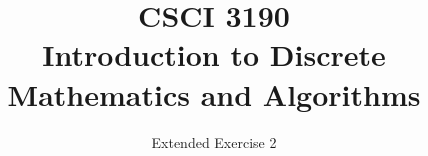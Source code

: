 \documentclass{sig-alternate-05-2015}
\begin{document}






%

\title{CSCI 3190 \\ Introduction to Discrete Mathematics and Algorithms}
\subtitle{Extended Exercise 2}

\maketitle
\begin{abstract}

\end{abstract}

\keywords{}
\end{document}

